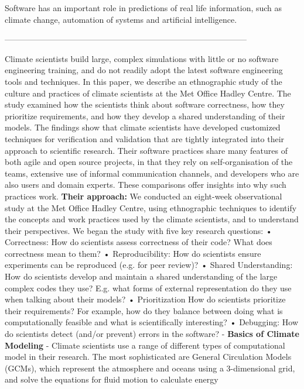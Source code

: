 Software has an important role in predictions of real life information, such as climate change, automation of systems and artificial intelligence. \cite{easterbrook2009engineering}\cite{chasmSoftware} 

-----------------------------------------------------------------------------------------

Climate scientists build large, complex simulations with
little or no software engineering training, and do not readily
adopt the latest software engineering tools and techniques.
In this paper, we describe an ethnographic study
of the culture and practices of climate scientists at the Met
Office Hadley Centre. The study examined how the scientists
think about software correctness, how they prioritize
requirements, and how they develop a shared understanding
of their models. The findings show that climate scientists
have developed customized techniques for verification
and validation that are tightly integrated into their approach
to scientific research. Their software practices share
many features of both agile and open source projects, in that
they rely on self-organisation of the teams, extensive use of
informal communication channels, and developers who are
also users and domain experts. These comparisons offer
insights into why such practices work.
\textbf{Their approach:} We conducted an eight-week observational study at the
Met Office Hadley Centre, using ethnographic techniques to
identify the concepts and work practices used by the climate
scientists, and to understand their perspectives. We began the study with five key research questions:
• Correctness: How do scientists assess correctness of
their code? What does correctness mean to them?
• Reproducibility: How do scientists ensure experiments
can be reproduced (e.g. for peer review)?
• Shared Understanding: How do scientists develop and
maintain a shared understanding of the large complex
codes they use? E.g. what forms of external representation
do they use when talking about their models?
• Prioritization How do scientists prioritize their requirements?
For example, how do they balance between
doing what is computationally feasible and what
is scientifically interesting?
• Debugging: How do scientists detect (and/or prevent)
errors in the software?
- \textbf{Basics of Climate Modeling} - Climate scientists use a range of different types of computational model in their research. The most sophisticated
are General Circulation Models (GCMs), which represent the atmosphere and oceans using a 3-dimensional grid, and
solve the equations for fluid motion to calculate energy
